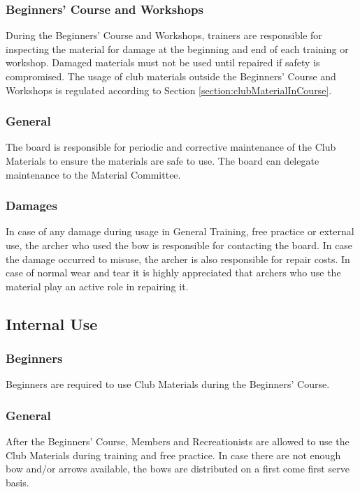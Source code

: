 \documentclass[a4paper]{article}
\begin{document}
\subsubsection{Beginners' Course and Workshops}
During the Beginners' Course and Workshops, trainers are responsible for inspecting the material for damage at the beginning and end of each training or workshop. Damaged materials must not be used until repaired if safety is compromised. The usage of club materials outside the Beginners' Course and Workshops is regulated according to Section \ref{section:clubMaterialInCourse}.

\subsubsection{General}
The board is responsible for periodic and corrective maintenance of the Club Materials to ensure the materials are safe to use. The board can delegate maintenance to the Material Committee. 

\subsubsection{Damages}
In case of any damage during usage in General Training, free practice or external use, the archer who used the bow is responsible for contacting the board. In case the damage occurred to misuse, the archer is also responsible for repair costs. In case of normal wear and tear it is highly appreciated that archers who use the material play an active role in repairing it.

\subsection{Internal Use}
\subsubsection{Beginners}
Beginners are required to use Club Materials during the Beginners' Course.

\subsubsection{General}
After the Beginners' Course, Members and Recreationists are allowed to use the Club Materials during training and free practice. In case there are not enough bow and/or arrows available, the bows are distributed on a first come first serve basis.
\end{document}
